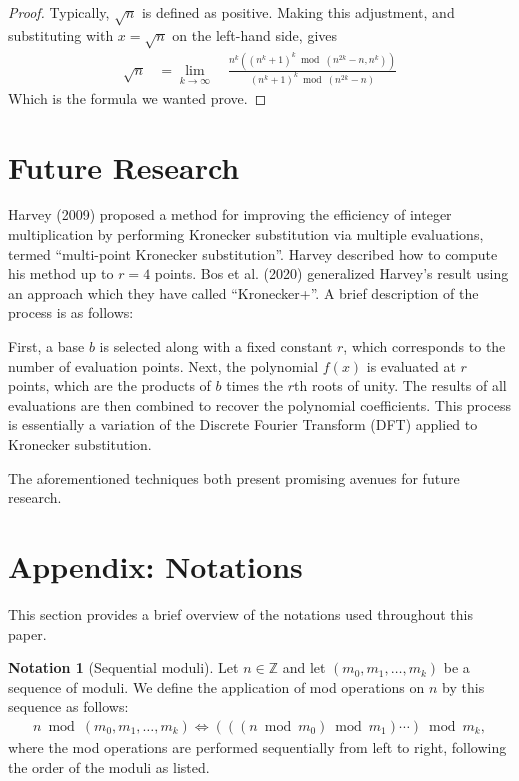 \documentclass[12pt,reqno]{article}
\theoremstyle{plain}
\theoremstyle{definition}
\newtheorem{notation}{Notation}
\begin{document}
\begin{proof}
Typically, $\sqrt{n}$ is defined as positive. Making this adjustment, and substituting with $x = \sqrt{n}$ on the left-hand side, gives
\begin{align*}
\sqrt{n} &= \lim_{k\rightarrow\infty} \quad
    \frac{n^k ((n^k + 1)^k \bmod{(n^{2k}-n, n^k)})}
        {(n^k + 1)^k \bmod{(n^{2k}-n)}}
\end{align*}
Which is the formula we wanted prove.
\end{proof}

\section{Future Research} \label{section:futureresearch}
Harvey (2009) \cite{harvey2009kronecker} proposed a method for improving the efficiency of integer multiplication by performing Kronecker substitution via multiple evaluations, termed ``multi-point Kronecker substitution''. Harvey described how to compute his method up to $r=4$ points. Bos et al. (2020) \cite{bos2020postquantum} generalized Harvey's result using an approach which they have called ``Kronecker+''. A brief description of the process is as follows:

First, a base $b$ is selected along with a fixed constant $r$, which corresponds to the number of evaluation points. Next, the polynomial $f(x)$ is evaluated at $r$ points, which are the products of $b$ times the $r$th roots of unity. The results of all evaluations are then combined to recover the polynomial coefficients. This process is essentially a variation of the Discrete Fourier Transform (DFT) applied to Kronecker substitution.

The aforementioned techniques both present promising avenues for future research.

\section{Appendix: Notations} \label{section:notations}
This section provides a brief overview of the notations used throughout this paper.

\begin{notation}[Sequential moduli]
Let $n \in \mathbb{Z}$ and let $(m_0, m_1, \ldots, m_k)$ be a sequence of moduli. We define the application of mod operations on $n$ by this sequence as follows:
\begin{align*}
    n \bmod{(m_0, m_1, \ldots, m_k)} \Longleftrightarrow  (((n \bmod{m_0}) \bmod{m_1}) \cdots ) \bmod{m_k},
\end{align*}
where the mod operations are performed sequentially from left to right, following the order of the moduli as listed.
\end{notation}
\end{document}
